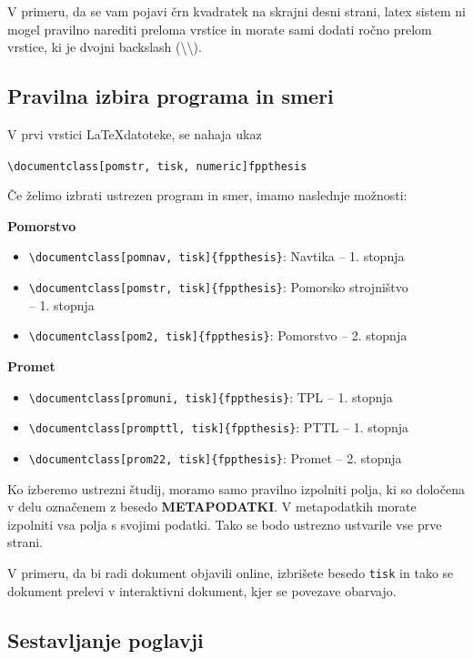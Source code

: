 \documentclass[12pt]{article}
\theoremstyle{definition}
\begin{document}
V primeru, da se vam pojavi črn kvadratek na skrajni desni strani, latex sistem ni mogel pravilno narediti preloma vrstice in morate sami dodati ročno prelom vrstice, ki je dvojni backslash (\textbackslash\textbackslash).


\subsection{Pravilna izbira programa in smeri}

V prvi vrstici \LaTeX datoteke, se nahaja ukaz

\texttt{\textbackslash documentclass[pomstr, tisk, numeric]{fppthesis}}

Če želimo izbrati ustrezen program in smer, imamo naslednje možnosti:

\textbf{Pomorstvo}
\begin{itemize}[nosep]
	\item \texttt{\textbackslash documentclass[pomnav, tisk]\{fppthesis\}}: Navtika -- 1. stopnja
	\item \texttt{\textbackslash documentclass[pomstr, tisk]\{fppthesis\}}: Pomorsko strojništvo\\
	-- 1. stopnja
	\item \texttt{\textbackslash documentclass[pom2, tisk]\{fppthesis\}}: Pomorstvo -- 2. stopnja
\end{itemize}

\textbf{Promet}
\begin{itemize}[nosep]
	\item \texttt{\textbackslash documentclass[promuni, tisk]\{fppthesis\}}: TPL -- 1. stopnja
	\item \texttt{\textbackslash documentclass[prompttl, tisk]\{fppthesis\}}: PTTL -- 1. stopnja
	\item \texttt{\textbackslash documentclass[prom22, tisk]\{fppthesis\}}: Promet -- 2. stopnja
\end{itemize}

Ko izberemo ustrezni študij, moramo samo pravilno izpolniti polja, ki so določena v delu označenem z besedo \textbf{METAPODATKI}. V metapodatkih morate izpolniti vsa polja s svojimi podatki. Tako se bodo ustrezno ustvarile vse prve strani.

V primeru, da bi radi dokument objavili online, izbrišete besedo \texttt{tisk} in tako se dokument prelevi v interaktivni dokument, kjer se povezave obarvajo.

\subsection{Sestavljanje poglavji}
\end{document}
